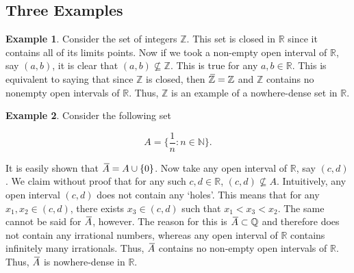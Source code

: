 \documentclass{article}
\theoremstyle{definition}
\theoremstyle{remark}
\newcommand{\closure}[2][3]{%
  {}\mkern#1mu\overline{\mkern-#1mu#2}}
\theoremstyle{definition}
\newtheorem{example}{Example}[section]
\begin{document}
\subsection{Three Examples}

\begin{example}
    Consider the set of integers $\mathbb{Z}$. This set is closed in $\mathbb{R}$ since it contains all of its limits points. Now if we took a non-empty open interval of $\mathbb{R}$, say $(a,b)$, it is clear that $(a,b)\not\subseteq\mathbb{Z}$. This is true for any $a,b\in\mathbb{R}$. This is equivalent to saying that since $\mathbb{Z}$ is closed, then $\closure{\mathbb{Z}}=\mathbb{Z}$ and $\mathbb{Z}$ contains no nonempty open intervals of $\mathbb{R}$. Thus, $\mathbb{Z}$ is an example of a nowhere-dense set in $\mathbb{R}$.
\end{example}

\begin{example}
    Consider the following set 
    
        \begin{equation*}
            A=\bigg\{\frac{1}{n}\colon n\in\mathbb{N}\bigg\}.
        \end{equation*}
        
    \noindent It is easily shown that $\closure{A}=A\cup\{0\}$. Now take any open interval of $\mathbb{R}$, say $(c,d)$. We claim without proof that for any such $c,d\in\mathbb{R}$, $(c,d)\not\subseteq A$. Intuitively, any open interval $(c, d)$ does not contain any `holes'. This means that for any $x_1, x_2\in(c,d)$, there exists $x_3\in(c,d)$ such that $x_1<x_3<x_2$. The same cannot be said for $\closure{A}$, however. The reason for this is $\closure{A}\subset\mathbb{Q}$ and therefore does not contain any irrational numbers, whereas any open interval of $\mathbb{R}$ contains infinitely many irrationals. Thus, $\closure{A}$ contains no non-empty open intervals of $\mathbb{R}$. Thus, $\closure{A}$ is nowhere-dense in $\mathbb{R}$. 
\end{example}
\end{document}
